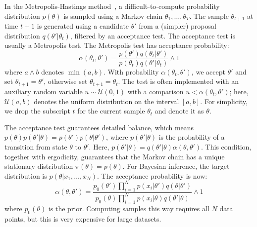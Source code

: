 \documentclass[letterpaper]{article}
\begin{document}
In the Metropolis-Hastings method~\citep{gilks1996markov,brooks2011handbook}, a
difficult-to-compute probability distribution $p(\theta)$ is sampled using a
Markov chain $\theta_1,\ldots,\theta_T$. The sample $\theta_{t+1}$ at time $t+1$
is generated using a candidate $\theta'$ from a (simpler) proposal distribution
$q(\theta'|\theta_t)$, filtered by an acceptance test. The acceptance test
is usually a Metropolis test. The Metropolis test has acceptance probability:
\begin{equation}\label{eq:traditional}
    \alpha(\theta_t,\theta') = \frac{p(\theta')q(\theta_t | \theta')}{p(\theta_t)q(\theta' | \theta_t)} \wedge 1
\end{equation}
where $a \wedge b$ denotes $\min(a,b)$.  With probability
$\alpha(\theta_t,\theta')$, we accept $\theta'$ and set $\theta_{t+1} =
\theta'$, otherwise set $\theta_{t+1}=\theta_t$.  The test is often implemented
with an auxiliary random variable $u \sim \mathcal{U}(0,1)$ with a comparison
$u<\alpha(\theta_t,\theta')$; here, $\mathcal{U}(a,b)$ denotes the uniform
distribution on the interval $[a,b]$.  For simplicity, we drop the subscript $t$
for the current sample $\theta_t$ and denote it as $\theta$. 

The acceptance test guarantees detailed balance, which means
$p(\theta)p(\theta'|\theta) = p(\theta')p(\theta|\theta')$, where
$p(\theta'|\theta)$ is the probability of a transition from state $\theta$ to
$\theta'$. Here, $p(\theta'|\theta)=q(\theta'|\theta)\alpha(\theta,\theta')$.
This condition, together with ergodicity, guarantees that the Markov chain has a
unique stationary distribution $\pi(\theta) = p(\theta)$. For Bayesian
inference, the target distribution is $p(\theta | x_1, \ldots, x_N)$. The
acceptance probability is now:
\begin{equation}\label{eq:acceptance_probability}
    \alpha(\theta,\theta') = 
    \frac{p_0(\theta')\prod_{i=1}^N p(x_i | \theta')q(\theta |
    \theta')}{p_0(\theta)\prod_{i=1}^N p(x_i | \theta)q(\theta' | \theta)}
    \wedge 1
\end{equation}
where $p_0(\theta)$ is the prior. Computing samples this way requires all $N$
data points, but this is very expensive for large datasets.
\end{document}
